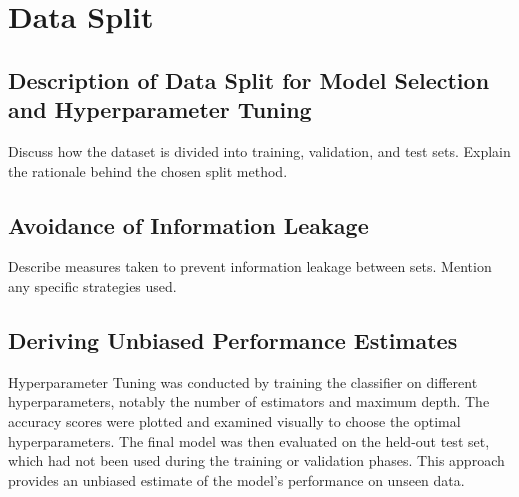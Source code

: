 \section{Data Split}

\subsection{Description of Data Split for Model Selection and Hyperparameter Tuning}
Discuss how the dataset is divided into training, validation, and test sets. Explain the rationale behind the chosen split method.

\subsection{Avoidance of Information Leakage}
Describe measures taken to prevent information leakage between sets. Mention any specific strategies used.

\subsection{Deriving Unbiased Performance Estimates}
Hyperparameter Tuning was conducted by training the classifier on different hyperparameters, notably the number of estimators and maximum depth. The accuracy scores were plotted and examined visually to choose the optimal hyperparameters.
The final model was then evaluated on the held-out test set, which had not been used during the training or validation phases. This approach provides an unbiased estimate of the model's performance on unseen data.
